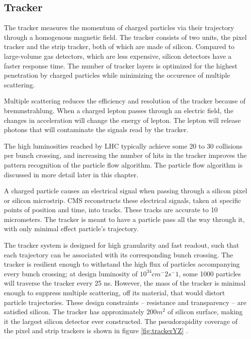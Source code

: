 \subsection{Tracker}

The tracker measures the momentum of charged particles via their trajectory through a homogenous magnetic field. The tracker consists of two units, the pixel tracker and the strip tracker, both of which are made of silicon. Compared to large-volume gas detectors, which are less expensive, silicon detectors have a faster response time. The number of tracker layers is optimized for the highest penetration by charged particles while minimizing the occurence of multiple scattering. 

Multiple scattering reduces the efficiency and resolution of the tracker because of bremmstrahlung. When a charged lepton passes through an electric field, the changes in acceleration will change the energy of lepton. The lepton will release photons that will contaminate the signals read by the tracker. 

The high luminosities reached by LHC typically achieve some 20 to 30 collisions per bunch crossing, and increasing the number of hits in the tracker improves the pattern recognition of the particle flow algorithm. The particle flow algorithm is discussed in more detail later in this chapter. 

A charged particle causes an electrical signal when passing through a silicon pixel or silicon microstrip. CMS reconstructs these electrical signals, taken at specific points of position and time, into tracks. These tracks are accurate to 10 micrometers. The tracker is meant to have  a particle pass all the way through it, with only minimal effect particle's trajectory. 

The tracker system is designed for high granularity and fast readout, such that each trajectory can be associated with its corresponding bunch crossing. The tracker is resilient enough to withstand the high flux of particles accompanying every bunch crossing; at design luminosity of $10^34 cm^-2 s^-1$, some 1000 particles will traverse the tracker every 25 ns. However, the mass of the tracker is minimal enough to suppress multiple scattering, off its material, that would distort particle trajectories. These design constraints -- resistance and transparency -- are satisfied silicon. The tracker has approximately $200 m^2$ of silicon surface, making it the largest silicon detector ever constructed. The pseudorapidity coverage of the pixel and strip trackers is shown in figure \ref{fig:trackerYZ} \cite{Chatrchyan:2009sr}.

